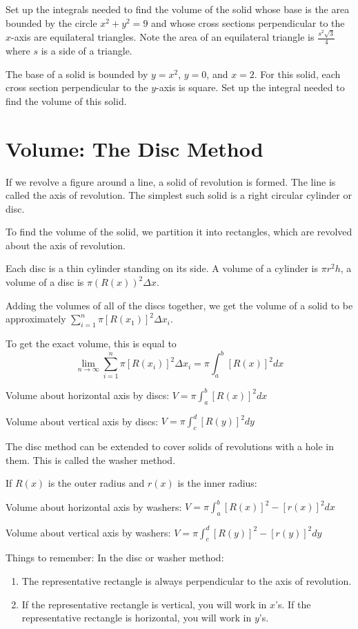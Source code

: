 \documentclass[../bccalc.tex]{subfiles}
\begin{document}
\ex Set up the integrals needed to find the volume of the solid whose base is the area bounded by the circle $x^2+y^2=9$ and whose cross sections perpendicular to the $x$-axis are equilateral triangles. Note the area of an equilateral triangle is $\frac{s^2\sqrt{3}}{4}$ where $s$ is a side of a triangle.

\ex The base of a solid is bounded by $y=x^2$, $y=0$, and $x=2$. For this solid, each cross section perpendicular to the $y$-axis is square. Set up the integral needed to find the volume of this solid.

\section{Volume: The Disc Method}
If we revolve a figure around a line, a solid of revolution is formed. The line is called the axis of revolution. The simplest such solid is a right circular cylinder or disc.

To find the volume of the solid, we partition it into rectangles, which are revolved about the axis of revolution.

Each disc is a thin cylinder standing on its side. A volume of a cylinder is $\pi r^2h$, a volume of a disc is $\pi (R(x))^2\Delta x$.

Adding the volumes of all of the discs together, we get the volume of a solid to be approximately $\sum_{i=1}^n \pi[R(x_1)]^2\Delta x_i$.

To get the exact volume, this is equal to 
\[ \lim_{n\to \infty}\sum_{i=1}^n \pi[R(x_i)]^2\Delta x_i = \pi\int_a^b [R(x)]^2 dx \]

Volume about horizontal axis by discs: $V=\pi \int_a^b [R(x)]^2 dx$

Volume about vertical axis by discs: $V=\pi \int_c^d [R(y)]^2 dy$

The disc method can be extended to cover solids of revolutions with a hole in them. This is called the washer method.

If $R(x)$ is the outer radius and $r(x)$ is the inner radius:

Volume about horizontal axis by washers: $V=\pi \int_a^b [R(x)]^2 - [r(x)]^2 dx$

Volume about vertical axis by washers: $V=\pi \int_c^d [R(y)]^2 - [r(y)]^2 dy$

Things to remember: In the disc or washer method:
\begin{enumerate}
    \item The representative rectangle is always perpendicular to the axis of revolution.
    \item If the representative rectangle is vertical, you will work in $x$'s. If the representative rectangle is horizontal, you will work in $y$'s.
\end{enumerate}
\end{document}
